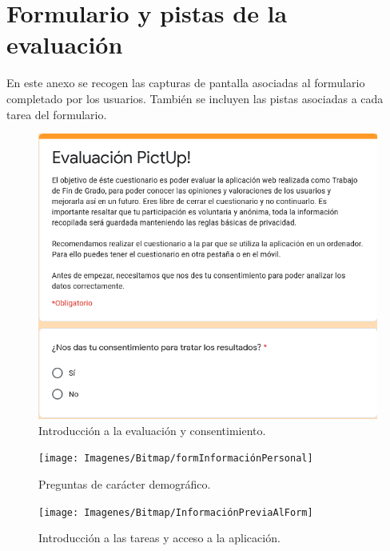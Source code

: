 \chapter{Formulario y pistas de la evaluación}
\label{Appendix:Key1}

En este anexo se recogen las capturas de pantalla asociadas al formulario completado por los usuarios. También se incluyen las pistas asociadas a cada tarea del formulario.

\begin{figure}[h!]
	\centering
	\includegraphics[width=\linewidth]{Imagenes/Bitmap/formIntro}
	\caption{Introducción a la evaluación y consentimiento.}
	\label{fig:formintro}
\end{figure}

\begin{figure}[h!]
	\centering
	\texttt{[image: Imagenes/Bitmap/formInformaciónPersonal]}
	\caption{Preguntas de carácter demográfico.}
	\label{fig:forminformacionpersonal}
\end{figure}

\begin{figure}[h!]
	\centering
	\texttt{[image: Imagenes/Bitmap/InformaciónPreviaAlForm]}
	\caption{Introducción a las tareas y acceso a la aplicación.}
	\label{fig:informacionpreviaalform}
\end{figure}





